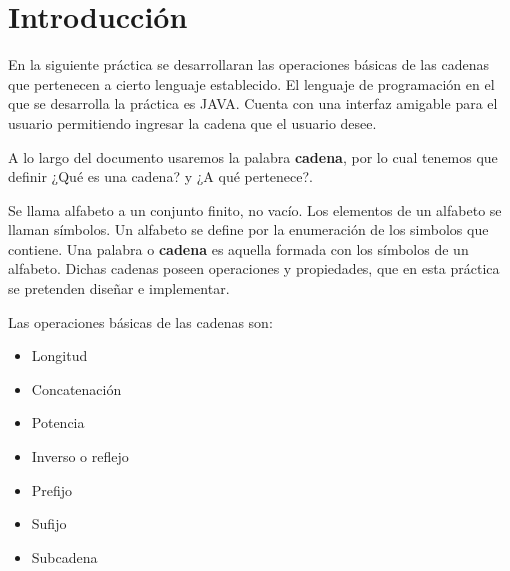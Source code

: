 \documentclass[12pt]{article}
\begin{document}
	\tableofcontents
		
	\maketitle
	
	\section{Introducción}
	En la siguiente práctica se desarrollaran las operaciones básicas de las cadenas que pertenecen a 
	cierto lenguaje establecido. El lenguaje de programación en el que se desarrolla la práctica es 
	JAVA. Cuenta con una interfaz amigable para el usuario permitiendo ingresar la cadena que el usuario
	desee.

	A lo largo del documento usaremos la palabra \textbf{cadena}, por lo cual tenemos que definir ¿Qué es una cadena? y ¿A qué pertenece?.

	Se llama alfabeto a un conjunto finito, no vacío. Los elementos de un alfabeto se llaman símbolos.
	Un alfabeto se define por la enumeración de los simbolos que contiene. Una palabra o \textbf{cadena} es aquella formada con los símbolos de un alfabeto. Dichas cadenas poseen operaciones y propiedades, que en esta práctica
	se pretenden diseñar e implementar.
	
	Las operaciones básicas de las cadenas son:
	\begin{multicols}{2}
		\begin{itemize}
			\item Longitud
			\item Concatenación
			\item Potencia
			\item Inverso o reflejo
	\breakcolumn
			\item Prefijo
			\item Sufijo
			\item Subcadena
		\end{itemize}
	\end{multicols}
	
\end{document}
